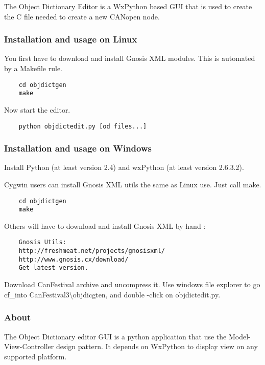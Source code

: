 \documentclass[12pt,english,a4paper]{book}
\newcommand{\canopen}{CANopen }
\begin{document}
The Object Dictionary Editor is a WxPython based GUI that is used
to create the C file needed to create a new \canopen node.


\subsubsection{Installation and usage on Linux}

You first have to download and install Gnosis XML modules. This is
automated by a Makefile rule.

\begin{verbatim}
	cd objdictgen 
	make
\end{verbatim}

Now start the editor.

\begin{verbatim}
	python objdictedit.py [od files...]
\end{verbatim}


\subsubsection{Installation and usage on Windows}

Install Python (at least version 2.4) and wxPython (at least version
2.6.3.2).

Cygwin users can install Gnosis XML utils the same as Linux use. Just
call make.

\begin{verbatim}
	cd objdictgen
	make
\end{verbatim}

Others will have to download and install Gnosis XML by hand :

\begin{verbatim}
	Gnosis Utils:
	http://freshmeat.net/projects/gnosisxml/
	http://www.gnosis.cx/download/
	Get latest version.
\end{verbatim}

Download CanFestival archive and uncompress it. Use windows file explorer
to go cf_into CanFestival3\textbackslash{}objdicgten, and double -click
on objdictedit.py.

\subsubsection{About}

The Object Dictionary editor GUI is a python application that use
the Model-View-Controller design pattern. It depends on WxPython to
display view on any supported platform.
\end{document}
